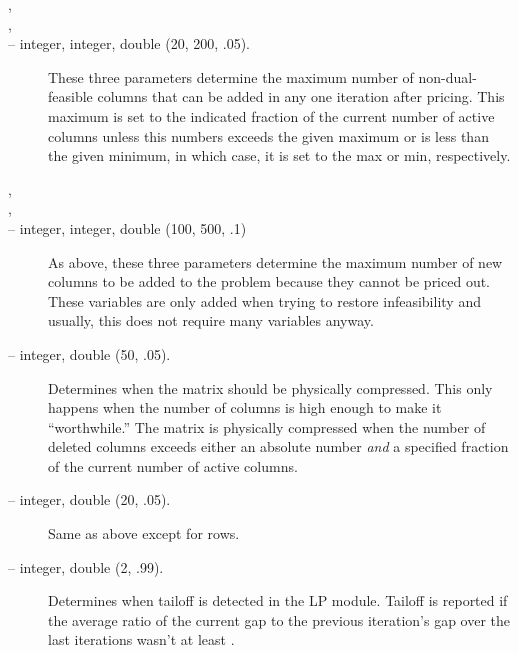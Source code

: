 \begin{description}
\item[,]
\item[,]
\item[ 
-- integer, integer, double (20, 200, .05).] 
These three parameters determine the maximum number of
non-dual-feasible columns that can be added in any one iteration
after pricing. This maximum is set to the indicated
fraction of the current number of active columns unless this numbers
exceeds the given maximum or is less than the given minimum, in which
case, it is set to the max or min, respectively.

\item[,]
\item[,]
\item[ -- integer, integer, double (100,
500, .1) ] 
As above, these three parameters determine the maximum number of new
columns to be added to the problem because they cannot be priced out.
These variables are only added when trying to restore infeasibility
and usually, this does not require many variables anyway.

\item[ -- integer,
double (50, .05).] 
Determines when the matrix should be physically compressed. This only
happens when the number of columns is high enough to make it
``worthwhile.'' The matrix is physically compressed when the number of
deleted columns exceeds either an absolute number {\em and} a specified
fraction of the current number of active columns.

\item[ -- integer,
double (20, .05).] 
Same as above except for rows.

\item[ -- integer, double
(2, .99).] 
Determines when tailoff is detected in the LP module.
Tailoff is reported if the average ratio of the current gap to the
previous iteration's gap over the last 
iterations wasn't at least .


\end{description}
